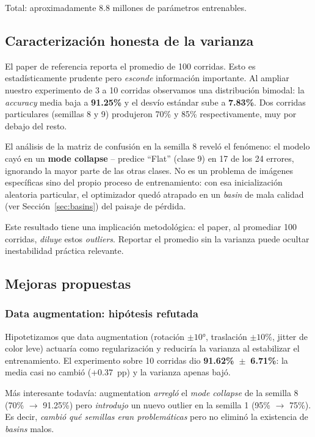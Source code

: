 \documentclass[a4paper,11pt]{article}
\begin{document}
Total: aproximadamente 8.8 millones de parámetros entrenables.

\subsection{Caracterización honesta de la varianza}
\label{sec:varianza}

El paper de referencia reporta el promedio de 100 corridas. Esto es estadísticamente prudente pero \emph{esconde} información importante. Al ampliar nuestro experimento de 3 a 10 corridas observamos una distribución bimodal: la \textit{accuracy} media baja a \textbf{91.25\%} y el desvío estándar sube a \textbf{7.83\%}. Dos corridas particulares (semillas 8 y 9) produjeron 70\% y 85\% respectivamente, muy por debajo del resto.

El análisis de la matriz de confusión en la semilla 8 reveló el fenómeno: el modelo cayó en un \textbf{mode collapse} -- predice ``Flat'' (clase 9) en 17 de los 24 errores, ignorando la mayor parte de las otras clases. No es un problema de imágenes específicas sino del propio proceso de entrenamiento: con esa inicialización aleatoria particular, el optimizador quedó atrapado en un \textit{basin} de mala calidad (ver Sección~\ref{sec:basins}) del paisaje de pérdida.

Este resultado tiene una implicación metodológica: el paper, al promediar 100 corridas, \emph{diluye} estos \textit{outliers}. Reportar el promedio sin la varianza puede ocultar inestabilidad práctica relevante.

\subsection{Mejoras propuestas}

\subsubsection{Data augmentation: hipótesis refutada}

Hipotetizamos que data augmentation (rotación $\pm 10°$, traslación $\pm 10\%$, jitter de color leve) actuaría como regularización y reduciría la varianza al estabilizar el entrenamiento. El experimento sobre 10 corridas dio \textbf{91.62\%~$\pm$~6.71\%}: la media casi no cambió (+0.37~pp) y la varianza apenas bajó.

Más interesante todavía: augmentation \emph{arregló} el \textit{mode collapse} de la semilla 8 (70\% $\rightarrow$ 91.25\%) pero \emph{introdujo} un nuevo outlier en la semilla 1 (95\% $\rightarrow$ 75\%). Es decir, \emph{cambió qué semillas eran problemáticas} pero no eliminó la existencia de \textit{basins} malos.
\end{document}
